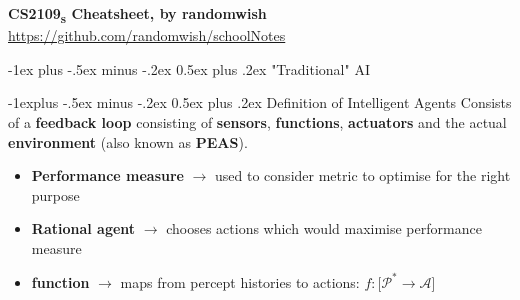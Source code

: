\documentclass[a4paper,10pt,landscape]{article}
\makeatletter
\renewcommand{\section}{\@startsection{section}{1}{0mm}%
                                {-1ex plus -.5ex minus -.2ex}%
                                {0.5ex plus .2ex}%
                                {\normalfont\large\bfseries}}
\renewcommand{\subsection}{\@startsection{subsection}{2}{0mm}%
                                {-1explus -.5ex minus -.2ex}%
                                {0.5ex plus .2ex}%
                                {\normalfont\normalsize\bfseries}}
\makeatother
\begin{document}
\raggedright
\footnotesize

\begin{center}
    {\Large\textbf{CS2109\textsubscript{s} Cheatsheet, by randomwish}}\\[0.5em]
    \url{https://github.com/randomwish/schoolNotes}
\end{center}
\begin{multicols}{3}
\setlength{\premulticols}{1pt}
\setlength{\postmulticols}{1pt}
\setlength{\multicolsep}{1pt}
\setlength{\columnsep}{2pt}

\section{"Traditional" AI}

\subsection{Definition of Intelligent Agents}
Consists of a \textbf{feedback loop} consisting of \textbf{sensors}, \textbf{functions}, \textbf{actuators} and
the actual \textbf{environment} (also known as \textbf{PEAS}).
\begin{itemize}
    \item \textbf{Performance measure} $\rightarrow$ used to consider metric to optimise for the right purpose
    \item \textbf{Rational agent} $\rightarrow$ chooses actions which would maximise performance measure
    \item \textbf{function} $\rightarrow$ maps from percept histories to actions: 
    $f : [\mathcal{P}^* \rightarrow \mathcal{A}$]
\end{itemize}


\end{multicols}
\end{document}
